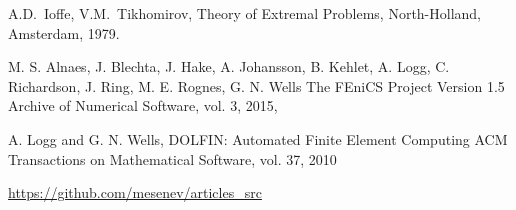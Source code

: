\documentclass[12pt]{article}
\begin{document}
\begin{thebibliography}{999}
         A.D.~Ioffe, V.M.~Tikhomirov, Theory of Extremal
        Problems, North-Holland, Amsterdam, 1979.

         M. S. Alnaes, J. Blechta, J. Hake, A. Johansson,
        B. Kehlet, A. Logg, C. Richardson, J. Ring, M. E. Rognes, G. N. Wells
        The FEniCS Project Version 1.5
        Archive of Numerical Software, vol. 3, 2015,

         A. Logg and G. N. Wells, DOLFIN: Automated Finite Element Computing
        ACM Transactions on Mathematical Software, vol. 37, 2010


         \url{https://github.com/mesenev/articles_src}

    \end{thebibliography}
\end{document}
